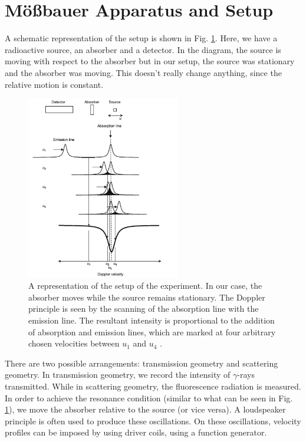 \documentclass[a4paper]{report}
\numberwithin{equation}{section}
\begin{document}
\section{M\"o{\ss}bauer Apparatus and Setup}

A schematic representation of the setup is shown in Fig. \ref{fig:setup}. Here, we have a radioactive source, an absorber and a detector. In the diagram, the source is moving with respect to the absorber but in our setup, the source was stationary and the absorber was moving. This doesn't really change anything, since the relative motion is constant. 

\begin{figure}[htpb]
    \centering
    \includegraphics[width=0.6\textwidth]{setup}
	\caption{A representation of the setup of the experiment. In our case, the absorber moves while the source remains stationary. The Doppler principle is seen by the scanning of the absorption line with the emission line. The resultant intensity is proportional to the addition of absorption and emission lines, which are marked at four arbitrary chosen velocities between $u_{1}$ and $u_{4}$ \cite{Kuzmann2011}.}
    \label{fig:setup}
\end{figure}

There are two possible arrangements: transmission geometry and scattering geometry. In  transmission geometry, we record the intensity of $\gamma$-rays transmitted. While in scattering geometry, the fluorescence radiation is measured. In order to achieve the resonance condition (similar to what can be seen in Fig. \ref{fig:setup}), we move the absorber relative to the source (or vice versa). A loudspeaker principle is often used to produce these oscillations. On these oscillations, velocity profiles can be imposed by using driver coils, using a function generator. 
\end{document}
